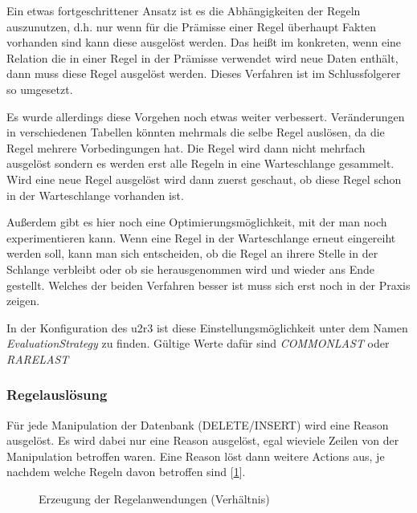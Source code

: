 Ein etwas fortgeschrittener Ansatz ist es die Abhängigkeiten der Regeln auszunutzen, d.h. nur wenn für die Prämisse einer Regel überhaupt Fakten vorhanden sind kann diese ausgelöst werden. Das heißt im konkreten, wenn eine Relation die in einer Regel in der Prämisse verwendet wird neue Daten enthält, dann muss diese Regel ausgelöst werden. Dieses Verfahren ist im Schlussfolgerer so umgesetzt.

Es wurde allerdings diese Vorgehen noch etwas weiter verbessert. Veränderungen in verschiedenen Tabellen könnten mehrmals die selbe Regel auslösen, da die Regel mehrere Vorbedingungen  hat. Die Regel wird dann nicht mehrfach ausgelöst sondern es werden erst alle Regeln in eine Warteschlange gesammelt. Wird eine neue Regel ausgelöst wird dann zuerst geschaut, ob diese Regel schon in der Warteschlange vorhanden ist.

Außerdem gibt es hier noch eine Optimierungsmöglichkeit, mit der man noch experimentieren kann. Wenn eine Regel in der Warteschlange erneut eingereiht werden soll, kann man sich entscheiden, ob die Regel an ihrere Stelle in der Schlange verbleibt oder ob sie herausgenommen wird und wieder ans Ende gestellt. Welches der beiden Verfahren besser ist muss sich erst noch in der Praxis zeigen.

In der Konfiguration des u2r3 ist diese Einstellungsmöglichkeit unter dem Namen \emph{EvaluationStrategy} zu finden. Gültige Werte dafür sind \emph{COMMONLAST} oder \emph{RARELAST}

\subsubsection{Regelauslösung}
Für jede Manipulation der Datenbank (DELETE/INSERT) wird eine Reason ausgelöst. Es wird dabei nur eine Reason ausgelöst, egal wieviele Zeilen von der Manipulation betroffen waren. Eine Reason löst dann weitere Actions aus, je nachdem welche Regeln davon betroffen sind [\ref{diagram-ruleexecution1}].

\begin{figure}[htp]
\begin{center}
  \caption{Erzeugung der Regelanwendungen (Verhältnis)}
  \label{diagram-ruleexecution1}
\end{center}
\end{figure}

